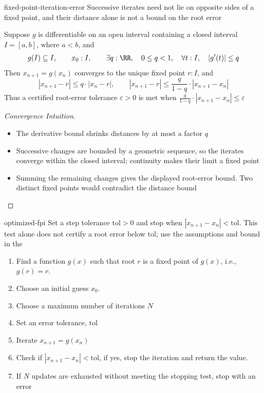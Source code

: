 \documentclass[12pt]{article}
\numberwithin{figure}{section}
\begin{document}
\begin{rem}{fixed-point-iteration-error}
  Successive iterates need not lie on opposite sides of a fixed point,
  and their distance alone is not a bound on the root error

  Suppose $g$ is differentiable on an open interval containing a closed
  interval $I=[a,b]$, where $a<b$, and
  \[
    g(I)\subseteq I,\qquad x_0:I,\qquad
    \exists q:\RR,\quad 0\leq q<1,\quad
    \forall t:I,\quad |g'(t)|\leq q
  \]
  Then $x_{n+1}=g(x_n)$ converges to the unique fixed point $r:I$, and
  \[
    |x_{n+1}-r|\leq q\cdot|x_n-r|,\qquad
    |x_{n+1}-r|\leq\frac{q}{1-q}\cdot|x_{n+1}-x_n|
  \]
  Thus a certified root-error tolerance $\varepsilon>0$ is met when
  $\frac{q}{1-q}\cdot|x_{n+1}-x_n|\leq\varepsilon$
\end{rem}

\begin{proof}[Convergence Intuition]
  \leavevmode\par
  \begin{itemize}[nosep]
    \item The derivative bound shrinks distances by at most a factor $q$
    \item Successive changes are bounded by a geometric sequence, so the
      iterates converge within the closed interval; continuity makes
      their limit a fixed point
    \item Summing the remaining changes gives the displayed root-error
      bound. Two distinct fixed points would contradict the distance bound
  \end{itemize}
\end{proof}

\begin{conv}{optimized-fpi}
  Set a step tolerance $\mathrm{tol}>0$ and stop when
  $|x_{n+1}-x_n|<\mathrm{tol}$. This test alone does not certify a root
  error below $\mathrm{tol}$; use the assumptions and bound in the
    \begin{enumerate}[nosep]
    \item Find a function $g(x)$ such that root $r$ is a fixed point of $g(x)$, i.e., $g(r) = r$.
    \item Choose an initial guess $x_0$.
    \item Choose a maximum number of iterations $N$ 
    \item Set an error tolerance, $\mathrm{tol}$ 
    \item Iterate $x_{n+1} = g(x_n)$ 
    \item Check if $|x_{n+1} - x_n| < \mathrm{tol}$, if yes, stop the iteration and return the value. 
    \item If $N$ updates are exhausted without meeting the stopping test, stop with an error
  \end{enumerate} 

  
\end{conv}
\end{document}
